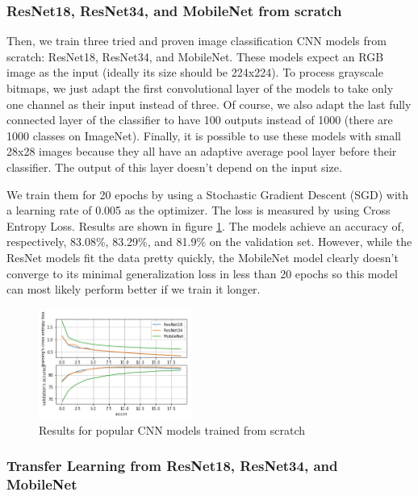 \documentclass[10pt,twocolumn,letterpaper]{article}
\begin{document}
\subsubsection{ResNet18, ResNet34, and MobileNet from scratch}

Then, we train three tried and proven image classification CNN models from scratch: ResNet18, ResNet34, and MobileNet. These models expect an RGB image as the input (ideally its size should be 224x224). To process grayscale bitmaps, we just adapt the first convolutional layer of the models to take only one channel as their input instead of three. Of course, we also adapt the last fully connected layer of the classifier to have 100 outputs instead of 1000 (there are 1000 classes on ImageNet). Finally, it is possible to use these models with small 28x28 images because they all have an adaptive average pool layer before their classifier. The output of this layer doesn't depend on the input size.

We train them for 20 epochs by using a Stochastic Gradient Descent (SGD) with a learning rate of 0.005 as the optimizer. The loss is measured by using Cross Entropy Loss. Results are shown in figure \ref{fig:cnn_scratch}. The models achieve an accuracy of, respectively, 83.08\%, 83.29\%, and 81.9\% on the validation set. However, while the ResNet models fit the data pretty quickly, the MobileNet model clearly doesn't converge to its minimal generalization loss in less than 20 epochs so this model can most likely perform better if we train it longer.

\begin{figure}[h] 
\centering
\includegraphics[width=0.45\textwidth]{images/cnn_scratch_results.png}
\caption{Results for popular CNN models trained from scratch}
\label{fig:cnn_scratch}
\end{figure}

\subsubsection{Transfer Learning from ResNet18, ResNet34, and MobileNet}
\end{document}
